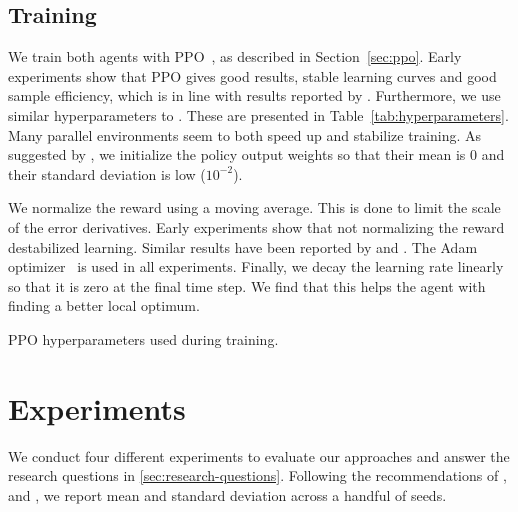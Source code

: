 
\subsection{Training}

We train both agents with PPO~\cite{schulman_ppo_2017}, as described in Section~\ref{sec:ppo}.
Early experiments show that PPO gives good results, stable learning curves and good sample efficiency, which is in line with results reported by \cite{andrychowicz_empirical_2020}.
Furthermore, we use similar hyperparameters to \cite{cobbe_procgen_2020}.
These are presented in Table~\ref{tab:hyperparameters}.
Many parallel environments seem to both speed up and stabilize training. 
As suggested by \cite{andrychowicz_empirical_2020}, we initialize the policy output weights so that their mean is 0 and their standard deviation is low (\(10^{-2}\)).

We normalize the reward using a moving average.
This is done to limit the scale of the error derivatives.
Early experiments show that not normalizing the reward destabilized learning. %
Similar results have been reported by \cite{andrychowicz_empirical_2020} and \cite{mnih_atari_2013}.
The Adam optimizer~\cite{kingma_ba_2017} is used in all experiments.
Finally, we decay the learning rate linearly so that it is zero at the final time step.
We find that this helps the agent with finding a better local optimum.

\begin{table}
    \centering
    \caption[PPO hyperparameters]{PPO hyperparameters used during training.}
    
    \label{tab:hyperparameters}
\end{table}

\section{Experiments}
\label{sec:experiments}

We conduct four different experiments to evaluate our approaches and answer the research questions in \ref{sec:research-questions}. 
Following the recommendations of \cite{henderson_matters_2018}, \cite{colas_hitchhiker_2019} and \cite{agarwal_rlliable_2022}, we report mean and standard deviation across a handful of seeds.

